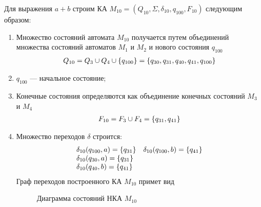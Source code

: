 \newpage
Для выражения \(a+b\) строим КА \(M_{10} = (Q_{10}, \Sigma, \delta_{10}, q_{100}, F_{10})\) следующим образом:
\begin{enumerate}
	\item Множество состояний автомата \(M_{10}\) получается путем объединений множества состояний автоматов \(M_1\) и \(M_2\) и нового состояния \(q_{100}\)
	      \begin{align*}
		      Q_{10} = Q_3 \cup Q_4 \cup \left\{q_{100}\right\} = \left\{q_{30}, q_{31}, q_{40}, q_{41}, q_{100}\right\}
	      \end{align*}
	\item \(q_{100}\) --- начальное состояние;
	\item Конечные состояния определяются как объединение конечных состояний \(M_3\) и \(M_4\)
	      \begin{align*}
		      F_{10} = F_{3} \cup F_{4} = \left\{q_{31}, q_{41}\right\}
	      \end{align*}
	\item Множество переходов \(\delta\) строится:
	      \begin{align*}
		      \begin{array}{ll}
			      \delta_{10}(q_{100}, a) = \left\{q_{31}\right\} & \delta_{10}(q_{100}, b) = \left\{q_{41}\right\} \\
			      \delta_{10}(q_{30}, a) = \left\{q_{31}\right\}                                           \\
			      \delta_{10}(q_{40}, b) = \left\{q_{41}\right\}
		      \end{array}
	      \end{align*}
	      Граф переходов построенного КА \(M_{10}\) примет вид
	      \begin{figure}[h!]
		      \centering
		      \caption{Диаграмма состояний НКА \(M_{10}\)}
	      \end{figure}
\end{enumerate}
